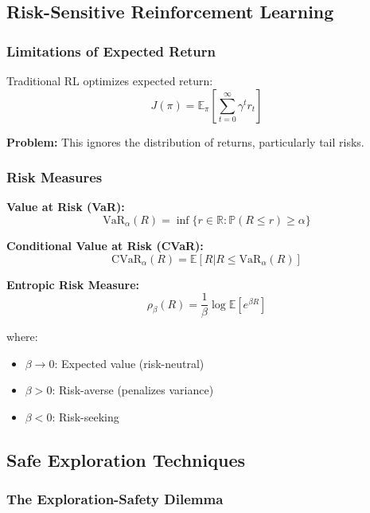 \documentclass[12pt]{article}
\begin{document}
{{{{\subsection{Risk-Sensitive Reinforcement Learning}

\subsubsection{Limitations of Expected Return}

Traditional RL optimizes expected return:
\begin{equation}
J(\pi) = \mathbb{E}_\pi\left[\sum_{t=0}^{\infty} \gamma^t r_t\right]
\end{equation}

\textbf{Problem:} This ignores the distribution of returns, particularly tail risks.

\subsubsection{Risk Measures}

\textbf{Value at Risk (VaR):}
\begin{equation}
\text{VaR}_\alpha(R) = \inf\{r \in \mathbb{R} : \mathbb{P}(R \leq r) \geq \alpha\}
\end{equation}

\textbf{Conditional Value at Risk (CVaR):}
\begin{equation}
\text{CVaR}_\alpha(R) = \mathbb{E}[R | R \leq \text{VaR}_\alpha(R)]
\end{equation}

\textbf{Entropic Risk Measure:}
\begin{equation}
\rho_\beta(R) = \frac{1}{\beta} \log \mathbb{E}[e^{\beta R}]
\end{equation}

where:
\begin{itemize}
\item $\beta \to 0$: Expected value (risk-neutral)
\item $\beta > 0$: Risk-averse (penalizes variance)
\item $\beta < 0$: Risk-seeking
\end{itemize}

\subsection{Safe Exploration Techniques}

\subsubsection{The Exploration-Safety Dilemma}

}}}}
\end{document}
